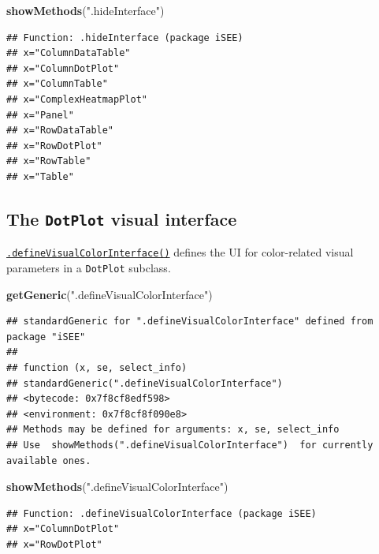 \documentclass[
]{book}
\newenvironment{Shaded}{\begin{snugshade}}{\end{snugshade}}
\newcommand{\KeywordTok}[1]{\textcolor[rgb]{0.13,0.29,0.53}{\textbf{#1}}}
\newcommand{\NormalTok}[1]{#1}
\newcommand{\StringTok}[1]{\textcolor[rgb]{0.31,0.60,0.02}{#1}}
\begin{document}
\begin{Shaded}
\begin{Highlighting}[]
\KeywordTok{showMethods}\NormalTok{(}\StringTok{".hideInterface"}\NormalTok{)}
\end{Highlighting}
\end{Shaded}

\begin{verbatim}
## Function: .hideInterface (package iSEE)
## x="ColumnDataTable"
## x="ColumnDotPlot"
## x="ColumnTable"
## x="ComplexHeatmapPlot"
## x="Panel"
## x="RowDataTable"
## x="RowDotPlot"
## x="RowTable"
## x="Table"
\end{verbatim}

\hypertarget{the-dotplot-visual-interface}{%
\subsection{\texorpdfstring{The \texttt{DotPlot} visual interface}{The DotPlot visual interface}}\label{the-dotplot-visual-interface}}

\href{https://isee.github.io/iSEE/reference/visual-parameters-generics.html}{\texttt{.defineVisualColorInterface()}} defines the UI for color-related visual parameters in a \texttt{DotPlot} subclass.

\begin{Shaded}
\begin{Highlighting}[]
\KeywordTok{getGeneric}\NormalTok{(}\StringTok{".defineVisualColorInterface"}\NormalTok{)}
\end{Highlighting}
\end{Shaded}

\begin{verbatim}
## standardGeneric for ".defineVisualColorInterface" defined from package "iSEE"
## 
## function (x, se, select_info) 
## standardGeneric(".defineVisualColorInterface")
## <bytecode: 0x7f8cf8edf598>
## <environment: 0x7f8cf8f090e8>
## Methods may be defined for arguments: x, se, select_info
## Use  showMethods(".defineVisualColorInterface")  for currently available ones.
\end{verbatim}

\begin{Shaded}
\begin{Highlighting}[]
\KeywordTok{showMethods}\NormalTok{(}\StringTok{".defineVisualColorInterface"}\NormalTok{)}
\end{Highlighting}
\end{Shaded}

\begin{verbatim}
## Function: .defineVisualColorInterface (package iSEE)
## x="ColumnDotPlot"
## x="RowDotPlot"
\end{verbatim}
\end{document}
